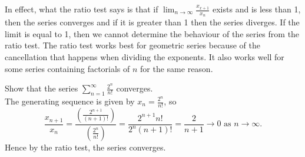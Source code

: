 \documentclass[../real_analysis.tex]{subfiles}
\begin{document}
        In effect, what the ratio test says is that if $\lim_{n\to\infty}\frac{x_{x+1}}{x_n}$ exists and is less than 1, then the series converges and if it is greater than 1 then the series diverges. If the limit is equal to 1, then we cannot determine the behaviour of the series from the ratio test. The ratio test works best for geometric series because of the cancellation that happens when dividing the exponents. It also works well for some series containing factorials of $n$ for the same reason.
        \begin{example}
            Show that the series $\sum_{n=1}^\infty\frac{2^n}{n!}$ converges.\\
            The generating sequence is given by $x_n=\frac{2^n}{n!}$, so
            \begin{equation}
                \frac{x_{n+1}}{x_n}=\frac{\left(\frac{2^{n+1}}{(n+1)!}\right)}{\left(\frac{2^n}{n!}\right)}=\frac{2^{n+1}n!}{2^n(n+1)!}=\frac{2}{n+1}\to0\text{ as }n\to\infty.
            \end{equation}
            Hence by the ratio test, the series converges.
        \end{example}
\end{document}
